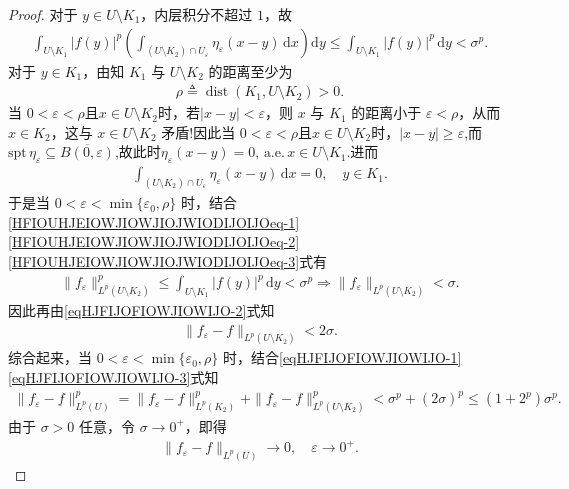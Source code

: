 \documentclass[../main.tex]{subfiles}
\begin{document}
\begin{proof}
对于 \(y\in U\setminus K_1\)，内层积分不超过 \(1\)，故
\begin{align}\label{HFIOUHJEIOWJIOWJIOJWIODIJOIJOeq-2}
\int_{U\setminus K_1}|f(y)|^p\left(\int_{(U\setminus K_2)\cap U_\varepsilon}\eta_\varepsilon(x-y)\,\mathrm{d}x\right)\mathrm{d}y
\leqslant\int_{U\setminus K_1}|f(y)|^p\,\mathrm{d}y<\sigma^p.
\end{align}
对于 \(y\in K_1\)，由知 \(K_1\) 与 \(U\setminus K_2\) 的距离至少为
\begin{align*}
\rho\triangleq\operatorname{dist}(K_1,U\setminus K_2)>0.
\end{align*}
当 \(0<\varepsilon<\rho\)且\(x\in U\setminus K_2\)时，若\(|x-y|<\varepsilon\)，则 \(x\) 与 \(K_1\) 的距离小于 \(\varepsilon<\rho\)，从而 \(x\in K_2\)，这与 \(x\in U\setminus K_2\) 矛盾!因此当 \(0<\varepsilon<\rho\)且\(x\in U\setminus K_2\)时，\(|x-y|\geqslant\varepsilon\),而$\text{spt}\,\eta_\varepsilon\subseteq \overline{B(0,\varepsilon)}$,故此时$\eta_\varepsilon(x-y)=0,\,\text{a.e.}\,x\in U\setminus K_1$.进而
\begin{align}\label{HFIOUHJEIOWJIOWJIOJWIODIJOIJOeq-3}
\int_{(U\setminus K_2)\cap U_\varepsilon}\eta_\varepsilon(x-y)\,\mathrm{d}x=0,\quad y\in K_1.
\end{align}
于是当 \(0<\varepsilon<\min\{\varepsilon_0,\rho\}\) 时，结合\eqref{HFIOUHJEIOWJIOWJIOJWIODIJOIJOeq-1}\eqref{HFIOUHJEIOWJIOWJIOJWIODIJOIJOeq-2}\eqref{HFIOUHJEIOWJIOWJIOJWIODIJOIJOeq-3}式有
\begin{align*}
\|f_\varepsilon\|_{L^p(U\setminus K_2)}^p
\leqslant\int_{U\setminus K_1}|f(y)|^p\,\mathrm{d}y<\sigma^p\Longrightarrow \|f_\varepsilon\|_{L^p(U\setminus K_2)}<\sigma.
\end{align*}
因此再由\eqref{eqHJFIJOFIOWJIOWIJO-2}式知
\begin{align}\label{eqHJFIJOFIOWJIOWIJO-3}
\|f_\varepsilon-f\|_{L^p(U\setminus K_2)}<2\sigma.
\end{align}
综合起来，当 \(0<\varepsilon<\min\{\varepsilon_0,\rho\}\) 时，结合\eqref{eqHJFIJOFIOWJIOWIJO-1}\eqref{eqHJFIJOFIOWJIOWIJO-3}式知
\begin{align*}
\|f_\varepsilon-f\|_{L^p(U)}^p
=\|f_\varepsilon-f\|_{L^p(K_2)}^p+\|f_\varepsilon-f\|_{L^p(U\setminus K_2)}^p<\sigma^p+(2\sigma)^p
\leqslant(1+2^p)\sigma^p.
\end{align*}
由于 \(\sigma>0\) 任意，令 \(\sigma\to0^+\)，即得
\begin{align*}
\|f_\varepsilon-f\|_{L^p(U)}\to0,\quad \varepsilon\to0^+.
\end{align*}
\end{proof}
\end{document}
